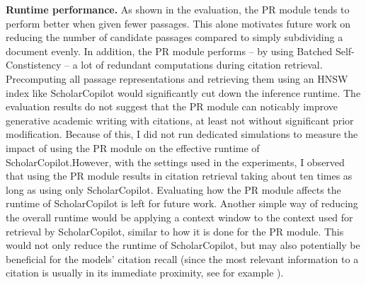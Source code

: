 \textbf{Runtime performance.} As shown in the evaluation, the PR module tends to perform better when given fewer passages. This alone motivates future work on reducing the number of candidate passages compared to simply subdividing a document evenly. In addition, the PR module performs -- by using Batched Self-Constistency \cite{korikov2025batched} -- a lot of redundant computations during citation retrieval. Precomputing all passage representations and retrieving them using an HNSW index like ScholarCopilot would significantly cut down the inference runtime. The evaluation results do not suggest that the PR module can noticably improve generative academic writing with citations, at least not without significant prior modification. Because of this, I did not run dedicated simulations to measure the impact of using the PR module on the effective runtime of ScholarCopilot.However, with the settings used in the experiments, I observed that using the PR module results in citation retrieval taking about ten times as long as using only ScholarCopilot. Evaluating how the PR module affects the runtime of ScholarCopilot is left for future work. Another simple way of reducing the overall runtime would be applying a context window to the context used for retrieval by ScholarCopilot, similar to how it is done for the PR module. This would not only reduce the runtime of ScholarCopilot, but may also potentially be beneficial for the models' citation recall (since the most relevant information to a citation is usually in its immediate proximity, see for example ).


